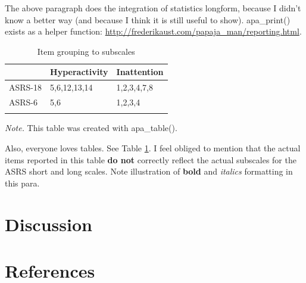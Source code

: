 \documentclass[
  ,jou,floatsintext]{apa6}
\begin{document}
The above paragraph does the integration of statistics longform, because I didn't know a better way (and because I think it is still useful to show). apa\_print() exists as a helper function: \url{http://frederikaust.com/papaja_man/reporting.html}.

\begin{table}[tbp]

\begin{center}
\begin{threeparttable}

\caption{\label{tab:asrssub}Item grouping to subscales}

\begin{tabular}{lll}
\toprule
 & \multicolumn{1}{c}{Hyperactivity} & \multicolumn{1}{c}{Inattention}\\
\midrule
ASRS-18 & 5,6,12,13,14 & 1,2,3,4,7,8\\
ASRS-6 & 5,6 & 1,2,3,4\\
\bottomrule
\addlinespace
\end{tabular}

\begin{tablenotes}[para]
\normalsize{\textit{Note.} This table was created with apa\_table().}
\end{tablenotes}

\end{threeparttable}
\end{center}

\end{table}

Also, everyone loves tables. See Table \ref{tab:asrssub}. I feel obliged to mention that the actual items reported in this table \textbf{do not} correctly reflect the actual subscales for the ASRS short and long scales. Note illustration of \textbf{bold} and \emph{italics} formatting in this para.

\hypertarget{discussion}{%
\section{Discussion}\label{discussion}}

\hypertarget{references}{%
\section*{References}\label{references}}
\end{document}
